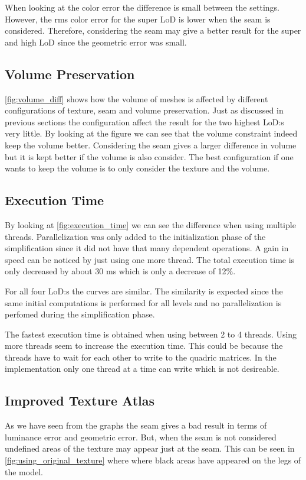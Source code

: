 When looking at the color error the difference is small between the settings. However, the rms color error for the super LoD is lower when the seam is considered. Therefore, considering the seam may give a better result for the super and high LoD since the geometric error was small.

\subsection{Volume Preservation} \label{sec:discussion_volume}
\cref{fig:volume_diff} shows how the volume of meshes is affected by different configurations of texture, seam and volume preservation. Just as discussed in previous sections the configuration affect the result for the two highest LoD:s very little. By looking at the figure we can see that the volume constraint indeed keep the volume better. Considering the seam gives a larger difference in volume but it is kept better if the volume is also consider. The best configuration if one wants to keep the volume is to only consider the texture and the volume.

\subsection{Execution Time} \label{sec:discussion_time}
By looking at \cref{fig:execution_time} we can see the difference when using multiple threads. Parallelization was only added to the initialization phase of the simplification since it did not have that many dependent operations. A gain in speed can be noticed by just using one more thread. The total execution time is only decreased by about 30 ms which is only a decrease of 12\%.

For all four LoD:s the curves are similar. The similarity is expected since the same initial computations is performed for all levels and no parallelization is perfomed during the simplification phase.

The fastest execution time is obtained when using between 2 to 4 threads. Using more threads seem to increase the execution time. This could be because the threads have to wait for each other to write to the quadric matrices. In the implementation only one thread at a time can write which is not desireable.


\subsection{Improved Texture Atlas} \label{sec:discussion_texture}
As we have seen from the graphs the seam gives a bad result in terms of luminance error and geometric error. But, when the seam is not considered undefined areas of the texture may appear just at the seam. This can be seen in \cref{fig:using_original_texture} where where black areas have appeared on the legs of the model.

